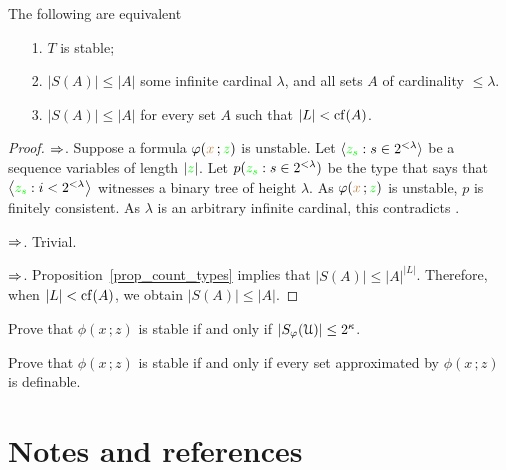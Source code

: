 \documentclass[creche.tex]{subfiles}
\begin{document}
\begin{theorem}
The following are equivalent
\begin{itemize}
\item[1.] $T$ is stable;
\item[2.] $|S(A)|\le|A|$ some infinite cardinal $\lambda$, and all sets $A$ of cardinality $\le\lambda$.
\item[3.] $|S(A)|\le|A|$ for every set $A$ such that $|L|<\mathop{\rm cf}(A)$.
\end{itemize}
\end{theorem}
\begin{proof}
$\Rightarrow$. Suppose a formula $\varphi({\color{brown} x}\,;{\color{green} z})$ is unstable. Let $\langle{\color{green}z_s}:s\in2^{<\lambda}\rangle$ be a sequence variables of length $|{\color{green} z}|$. Let $p({\color{green} z_s}:s\in2^{<\lambda})$ be the type that says that $\big\langle{\color{green}z_s}:i<2^{<\lambda}\big\rangle$ witnesses a binary tree of height $\lambda$. As  $\varphi({\color{brown} x}\,;{\color{green} z})$ is unstable, $p$ is finitely consistent. As $\lambda$ is an arbitrary infinite cardinal, this contradicts .

$\Rightarrow$. Trivial.

$\Rightarrow$. Proposition~\ref{prop_count_types} implies that $|S(A)|\le |A|^{|L|}$. Therefore, when $|L|<\mathop{\rm cf}(A)$, we obtain $|S(A)|\le |A|$.
\end{proof}
\begin{exercise}
Prove that $\phi(x\,;z)$ is stable if and only if $|S_\varphi(\EuScript U)|\le2^\kappa$.\QED
\end{exercise}

\begin{exercise}
Prove that $\phi(x\,;z)$ is stable if and only if every set approximated by $\phi(x\,;z)$ is definable.\QED
\end{exercise}

\section{Notes and references}
\begin{biblist}[]\normalsize


\end{biblist}
\end{document}
